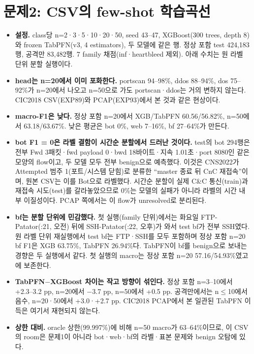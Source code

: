 \section{문제2: CSV의 few-shot 학습곡선}
\begin{itemize}
\item \textbf{설정.} class당 n=2·3·5·10·20·50, seed 43--47, XGBoost(300 trees, depth 8)와 frozen TabPFN(v3, 4 estimators), 두 모델에 같은 행. 정상 포함 test 424,183행, 공격만 83,482행. 7 family 채점(inf·heartbleed 제외). 아래 수치는 원 라벨 단위 분할 실행이다.
\item \textbf{head는 n=20에서 이미 포화한다.} portscan 94--98\%, ddos 88--94\%, dos 75--92\%가 n=20에서 나오고 n=50으로 가도 portscan·ddos는 거의 변하지 않는다. CIC2018 CSV(EXP89)와 PCAP(EXP93)에서 본 것과 같은 현상이다.
\item \textbf{macro-F1은 낮다.} 정상 포함 n=20에서 XGB/TabPFN 60.56/56.82\%, n=50에서 63.18/63.67\%. 낮은 평균은 bot 0\%, web 7--16\%, bf 27--64\%가 만든다.
\item \textbf{bot F1 = 0은 라벨 결함이 시간순 분할에서 드러난 것이다.} test의 bot 294행은 전부 Fwd 3패킷·fwd payload 0·bwd 18바이트·지속 1.01초·port 8080인 같은 모양의 flow이고, 두 모델 모두 전부 benign으로 예측했다. 이것은 CNS2022가 Attempted 범주 1(포트/시스템 닫힘)로 분류한 ``master 종료 뒤 CnC 재접속''이며, 원본 CSV는 이를 Bot으로 라벨했다. 시간순 분할이 실제 C\&C 통신(train)과 재접속 시도(test)를 갈라놓았으므로 0\%는 모델의 실패가 아니라 라벨의 시간 내부 이질성이다. PCAP 쪽에서는 이 flow가 unresolved로 분리된다.
\item \textbf{bf는 분할 단위에 민감했다.} 첫 실행(family 단위)에서는 화요일 FTP-Patator(:21, 오전) 뒤에 SSH-Patator(:22, 오후)가 와서 test bf가 전부 SSH였다. 원 라벨 단위 재실행에서 test bf는 FTP·SSH를 모두 포함하며 정상 포함 n=20 bf F1은 XGB 63.75\%, TabPFN 26.94\%다. TabPFN이 bf를 benign으로 보내는 경향은 두 실행에서 같다. 첫 실행의 macro는 정상 포함 n=20 57.16/54.93\%였고 에 보존한다.
\item \textbf{TabPFN$-$XGBoost 차이는 작고 방향이 섞인다.} 정상 포함 n=3--10에서 +2.3--3.2 pp, n=20에서 $-$3.7 pp, n=50에서 +0.5 pp. 공격만에서는 n$\le$10에서 음수, n=20·50에서 +3.0·+2.7 pp. CIC2018 PCAP에서 본 일관된 TabPFN 이득은 여기서 재현되지 않는다.
\item \textbf{상한 대비.} oracle 상한(99.997\%)에 비해 n=50 macro가 63--64\%이므로, 이 CSV의 room은 문제1이 아니라 bot·web·bf의 라벨·표본 문제와 benign 오탐에 있다.
\end{itemize}

